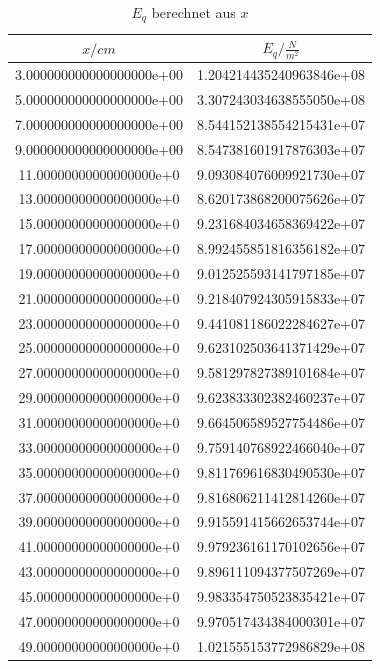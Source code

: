 \begin{table}
  \centering
  \caption{$E_q$ berechnet aus $x$}
  \label{tab:Eq}
  \begin{tabular}{S S}
    \toprule
    {$x/cm$} & {$E_q/ \frac{N}{m^2}$}\\
    \midrule
    3.000000000000000000e+00 & 1.204214435240963846e+08\\
    5.000000000000000000e+00 & 3.307243034638555050e+08\\
    7.000000000000000000e+00 & 8.544152138554215431e+07\\
    9.000000000000000000e+00 & 8.547381601917876303e+07\\
    11.00000000000000000e+0 & 9.093084076009921730e+07\\
    13.00000000000000000e+0 & 8.620173868200075626e+07\\
    15.00000000000000000e+0 & 9.231684034658369422e+07\\
    17.00000000000000000e+0 & 8.992455851816356182e+07\\
    19.00000000000000000e+0 & 9.012525593141797185e+07\\
    21.00000000000000000e+0 & 9.218407924305915833e+07\\
    23.00000000000000000e+0 & 9.441081186022284627e+07\\
    25.00000000000000000e+0 & 9.623102503641371429e+07\\
    27.00000000000000000e+0 & 9.581297827389101684e+07\\
    29.00000000000000000e+0 & 9.623833302382460237e+07\\
    31.00000000000000000e+0 & 9.664506589527754486e+07\\
    33.00000000000000000e+0 & 9.759140768922466040e+07\\
    35.00000000000000000e+0 & 9.811769616830490530e+07\\
    37.00000000000000000e+0 & 9.816806211412814260e+07\\
    39.00000000000000000e+0 & 9.915591415662653744e+07\\
    41.00000000000000000e+0 & 9.979236161170102656e+07\\
    43.00000000000000000e+0 & 9.896111094377507269e+07\\
    45.00000000000000000e+0 & 9.983354750523835421e+07\\
    47.00000000000000000e+0 & 9.970517434384000301e+07\\
    49.00000000000000000e+0 & 1.021555153772986829e+08\\

    \bottomrule
  \end{tabular}
\end{table}

